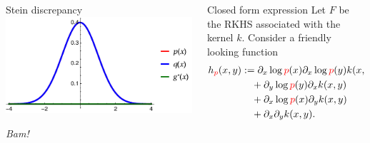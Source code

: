 \begin{frame}
\begin{columns}
\begin{column}{.33\linewidth}
\begin{block}{Stein discrepancy}
\includegraphics[scale=1.2]{../../presentation/img/s0.pdf}

\vspace{1cm}
\begin{center}
\emph{Bam!}
\end{center}
\end{block}
\end{column}

\hspace{-1.45cm}
\begin{column}{.33\linewidth}

\begin{block}{Closed form expression}
 Let $F$ be the RKHS associated with the kernel $k$. Consider a friendly looking function
\begin{align*}
h_{{\color{red} p}}(x,y) & := \partial_{x} \log {\color{red} p}(x) \partial_{x} \log {\color{red} p}(y) k(x,y)\\
 & \quad+\partial_{y} \log {\color{red} p}(y) \partial_{x}  k(x,y)\\
 & \quad+\partial_{x} \log {\color{red} p}(x) \partial_{y}k(x,y)\\
 & \quad+\partial_{x} \partial_{y} k(x,y).
\end{align*}
 

\end{block}
\end{column}
\end{columns}
\end{frame}
